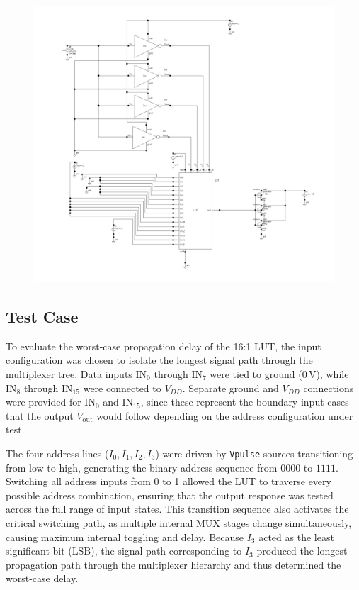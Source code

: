 \documentclass[12pt]{article}
\begin{document}
\begin{figure}[H]
    \centering
    \includegraphics[width=\linewidth]{writeup//figures/lut_delay_testbench.png}
    \caption{}
\end{figure}

\newpage

\subsection{Test Case}
To evaluate the worst-case propagation delay of the 16:1 LUT, the input configuration was chosen to isolate the longest signal path through the multiplexer tree. 
Data inputs \(\text{IN}_0\) through \(\text{IN}_7\) were tied to ground (\(0\,\text{V}\)), while \(\text{IN}_8\) through \(\text{IN}_{15}\) were connected to \(V_{DD}\). 
Separate ground and \(V_{DD}\) connections were provided for \(\text{IN}_0\) and \(\text{IN}_{15}\), since these represent the boundary input cases that the output \(V_{\text{out}}\) would follow depending on the address configuration under test. 

The four address lines (\(I_0, I_1, I_2, I_3\)) were driven by \texttt{Vpulse} sources transitioning from low to high, generating the binary address sequence from \(0000\) to \(1111\). 
Switching all address inputs from 0 to 1 allowed the LUT to traverse every possible address combination, ensuring that the output response was tested across the full range of input states. 
This transition sequence also activates the critical switching path, as multiple internal MUX stages change simultaneously, causing maximum internal toggling and delay. 
Because \(I_3\) acted as the least significant bit (LSB), the signal path corresponding to \(I_3\) produced the longest propagation path through the multiplexer hierarchy and thus determined the worst-case delay.
\end{document}
